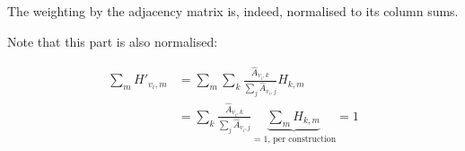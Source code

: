 \documentclass[]{article}
\begin{document}
The weighting by the adjacency matrix is, indeed, normalised to its column sums.

Note that this part is also normalised:

\begin{equation}
\begin{split}
	\sum_m H'_{v_i, m} & = \sum_m \sum_k \frac{\hat{A}_{v_i, k}}{\sum_j \hat{A}_{v_i, j}} H_{k, m} \\
	& = \sum_k \frac{\hat{A}_{v_i, k}}{\sum_j \hat{A}_{v_i, j}} \underbrace{\sum_m H_{k,m}}_{=1\text{, per construction}} = 1
\end{split}
\end{equation}

\printbibliography{}
\end{document}
